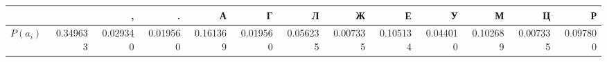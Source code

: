 \begin{tabular}{lrrrrrrrrrrrr}
\toprule
 &   & , & . & А & Г & Л & Ж & Е & У & М & Ц & Р \\
\midrule
$P(a_i)$ & 0.349633 & 0.029340 & 0.019560 & 0.161369 & 0.019560 & 0.056235 & 0.007335 & 0.105134 & 0.044010 & 0.102689 & 0.007335 & 0.097800 \\
\bottomrule
\end{tabular}
